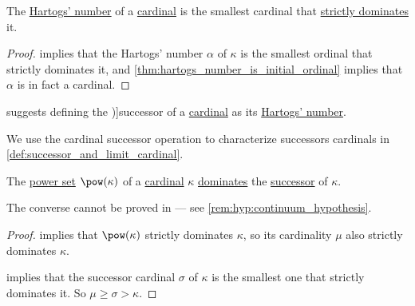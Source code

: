 \begin{proposition}\label{thm:hartogs_number_is_successor_cardinal}
  The \hyperref[def:hartogs_number]{Hartogs' number} of a \hyperref[def:cardinal]{cardinal} is the smallest cardinal that \hyperref[def:set_domination]{strictly dominates} it.
\end{proposition}
\begin{proof}
   implies that the Hartogs' number \( \alpha \) of \( \kappa \) is the smallest ordinal that strictly dominates it, and \cref{thm:hartogs_number_is_initial_ordinal} implies that \( \alpha \) is in fact a cardinal.
\end{proof}

\begin{definition}\label{def:cardinal_successor}
   suggests defining the \term[en=successor (cardinal) (\cite[def. 6.2.24(i)]{Hinman2005Logic})]{successor} of a \hyperref[def:cardinal]{cardinal} as its \hyperref[def:hartogs_number]{Hartogs' number}.
\end{definition}
\begin{comments}
  \item We use the cardinal successor operation to characterize successors cardinals in \cref{def:successor_and_limit_cardinal}.
\end{comments}

\begin{proposition}\label{thm:successor_cardinal_and_power_set}
  The \hyperref[def:power_set]{power set} \( \pow(\kappa) \) of a \hyperref[def:cardinal]{cardinal} \( \kappa \) \hyperref[def:set_domination]{dominates} the \hyperref[def:successor_and_limit_cardinal]{successor} of \( \kappa \).
\end{proposition}
\begin{comments}
  \item The converse cannot be proved in \hyperref[def:zfc]{} --- see \cref{rem:hyp:continuum_hypothesis}.
\end{comments}
\begin{proof}
   implies that \( \pow(\kappa) \) strictly dominates \( \kappa \), so its cardinality \( \mu \) also strictly dominates \( \kappa \).

   implies that the successor cardinal \( \sigma \) of \( \kappa \) is the smallest one that strictly dominates it. So \( \mu \geq \sigma > \kappa \).
\end{proof}

